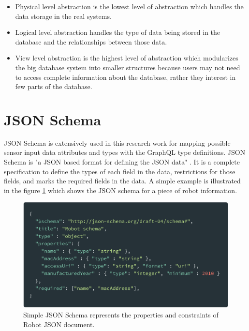 	\begin{itemize}
		\item Physical level abstraction is the lowest level of abstraction which handles the data storage in the real systems. 
		\item Logical level abstraction handles the type of data being stored in the database and the relationships between those data.
		\item View level abstraction is the highest level of abstraction which modularizes the big database system into smaller structures because users may not need to access complete information about the database, rather they interest in few parts of the database. 		
	\end{itemize}

 	\section{JSON Schema}
	
	JSON Schema is extensively used in this research work for mapping possible sensor input data attributes and types with the GraphQL type definitions. JSON Schema is "a JSON based format for defining the JSON data" \cite{misc13}. It is a complete specification to define the types of each field in the data, restrictions for those fields,  and marks the required fields in the data. A simple example is illustrated in the figure \ref{fig:json_schema} which shows the JSON schema for a piece of robot information. 
	
	\begin{figure}[!htbp] 
		\begin{center}
			\includegraphics[scale=0.1]{./images/png/json_schema}	
			\caption{Simple JSON Schema represents the properties and constraints of Robot JSON document.}	
			\label{fig:json_schema}	
		\end{center}
	\end{figure}
	
